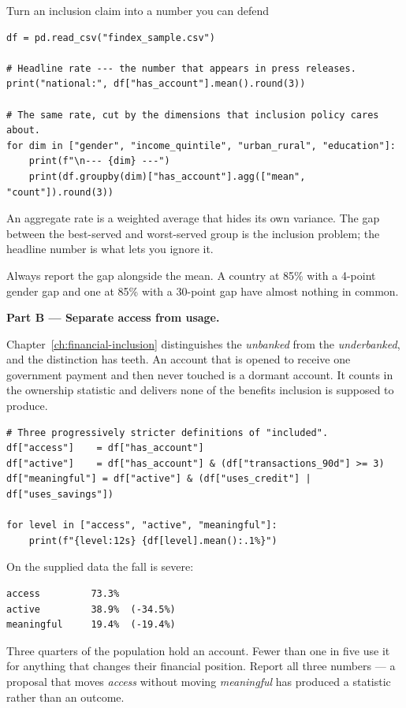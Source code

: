 \begin{labproject}{Turn an inclusion claim into a number you can defend}
\begin{lstlisting}[style=mlpython]
df = pd.read_csv("findex_sample.csv")

# Headline rate --- the number that appears in press releases.
print("national:", df["has_account"].mean().round(3))

# The same rate, cut by the dimensions that inclusion policy cares about.
for dim in ["gender", "income_quintile", "urban_rural", "education"]:
    print(f"\n--- {dim} ---")
    print(df.groupby(dim)["has_account"].agg(["mean", "count"]).round(3))
\end{lstlisting}

\begin{keyidea}
An aggregate rate is a weighted average that hides its own variance. The gap between the best-served and worst-served group is the inclusion problem; the headline number is what lets you ignore it.

Always report the gap alongside the mean. A country at 85\% with a 4-point gender gap and one at 85\% with a 30-point gap have almost nothing in common.
\end{keyidea}

\medskip\noindent\textbf{Part B --- Separate access from usage.}\par
Chapter~\ref{ch:financial-inclusion} distinguishes the \emph{unbanked} from the \emph{underbanked}, and the distinction has teeth. An account that is opened to receive one government payment and then never touched is a dormant account. It counts in the ownership statistic and delivers none of the benefits inclusion is supposed to produce.

\begin{lstlisting}[style=mlpython]
# Three progressively stricter definitions of "included".
df["access"]    = df["has_account"]
df["active"]    = df["has_account"] & (df["transactions_90d"] >= 3)
df["meaningful"] = df["active"] & (df["uses_credit"] | df["uses_savings"])

for level in ["access", "active", "meaningful"]:
    print(f"{level:12s} {df[level].mean():.1%}")
\end{lstlisting}

On the supplied data the fall is severe:

\begin{lstlisting}[style=mlterminal]
access         73.3%
active         38.9%  (-34.5%)
meaningful     19.4%  (-19.4%)
\end{lstlisting}

Three quarters of the population hold an account. Fewer than one in five use it for anything that changes their financial position. Report all three numbers --- a proposal that moves \emph{access} without moving \emph{meaningful} has produced a statistic rather than an outcome.


\end{labproject}
